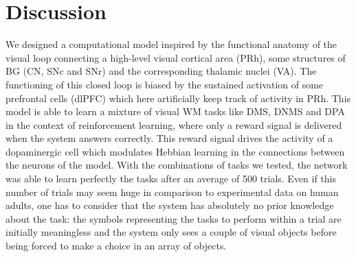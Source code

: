\documentclass[
  11pt,
  a4paper,
]{scrbook}
\begin{document}
\section{Discussion}\label{discussion-1}

We designed a computational model inspired by the functional anatomy of
the visual loop connecting a high-level visual cortical area (PRh), some
structures of BG (CN, SNc and SNr) and the corresponding thalamic nuclei
(VA). The functioning of this closed loop is biased by the sustained
activation of some prefrontal cells (dlPFC) which here artificially keep
track of activity in PRh. This model is able to learn a mixture of
visual WM tasks like DMS, DNMS and DPA in the context of reinforcement
learning, where only a reward signal is delivered when the system
answers correctly. This reward signal drives the activity of a
dopaminergic cell which modulates Hebbian learning in the connections
between the neurons of the model. With the combinations of tasks we
tested, the network was able to learn perfectly the tasks after an
average of 500 trials. Even if this number of trials may seem huge in
comparison to experimental data on human adults, one has to consider
that the system has absolutely no prior knowledge about the task: the
symbols representing the tasks to perform within a trial are initially
meaningless and the system only sees a couple of visual objects before
being forced to make a choice in an array of objects.
\end{document}
